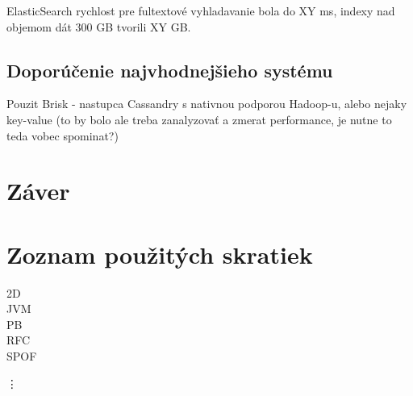 \documentclass[11pt,twoside,a4paper]{book}
\begin{document}
\noindent
ElasticSearch rychlost pre fultextové vyhladavanie bola do XY ms, indexy nad objemom dát 300 GB tvorili XY GB.

\section{Doporúčenie najvhodnejšieho systému}
Pouzit Brisk - nastupca Cassandry s nativnou podporou Hadoop-u, alebo nejaky key-value (to by bolo ale treba zanalyzovať a zmerat performance, je nutne to teda vobec spominat?)



\chapter{Záver}








%
{
\def\CS{$\cal C\kern-0.1667em\lower.5ex\hbox{$\cal S$}\kern-0.075em $}

}

%

\appendix



\chapter{Zoznam použitých skratiek}
\begin{description}
\item[2D]
\item[]
\item[JVM]
\item[PB]
\item[RFC]
\item[SPOF]
\end{description}
\vdots
\end{document}
